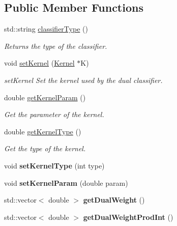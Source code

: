\subsection*{Public Member Functions}
\begin{DoxyCompactItemize}
\item 
std\+::string \hyperlink{class_dual_classifier_afbede25a3e30b87503c0c6555d52f358}{classifier\+Type} ()
\begin{DoxyCompactList}\small\item\em Returns the type of the classifier. \end{DoxyCompactList}\item 
void \hyperlink{class_dual_classifier_a2ff6033df59ac6071300e603d0dcb7e1}{set\+Kernel} (\hyperlink{class_kernel}{Kernel} $\ast$K)
\begin{DoxyCompactList}\small\item\em set\+Kernel Set the kernel used by the dual classifier. \end{DoxyCompactList}\item 
double \hyperlink{class_dual_classifier_a5738038f99450f5f3b7098d3125ffaae}{get\+Kernel\+Param} ()
\begin{DoxyCompactList}\small\item\em Get the parameter of the kernel. \end{DoxyCompactList}\item 
double \hyperlink{class_dual_classifier_a14b35e85dddac38e7927cd03037e2353}{get\+Kernel\+Type} ()
\begin{DoxyCompactList}\small\item\em Get the type of the kernel. \end{DoxyCompactList}\item 
\mbox{\label{class_dual_classifier_aa703a5fa36da53059f9f4cc392ea4ed4}} 
void {\bfseries set\+Kernel\+Type} (int type)
\item 
\mbox{\label{class_dual_classifier_a4965a8a7c9c696b00ba22e393939bb0d}} 
void {\bfseries set\+Kernel\+Param} (double param)
\item 
\mbox{\label{class_dual_classifier_a725e561df19f4f8562f6514286468e93}} 
std\+::vector$<$ double $>$ {\bfseries get\+Dual\+Weight} ()
\item 
\mbox{\label{class_dual_classifier_a7334a322297b40085bcdce37a88ef682}} 
std\+::vector$<$ double $>$ {\bfseries get\+Dual\+Weight\+Prod\+Int} ()
\end{DoxyCompactItemize}
